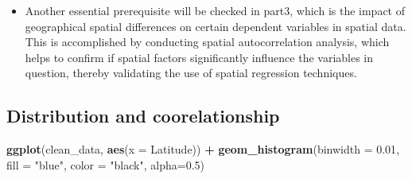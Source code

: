 \documentclass[
]{article}
\newenvironment{Shaded}{\begin{snugshade}}{\end{snugshade}}
\newcommand{\AttributeTok}[1]{\textcolor[rgb]{0.13,0.29,0.53}{#1}}
\newcommand{\FloatTok}[1]{\textcolor[rgb]{0.00,0.00,0.81}{#1}}
\newcommand{\FunctionTok}[1]{\textcolor[rgb]{0.13,0.29,0.53}{\textbf{#1}}}
\newcommand{\NormalTok}[1]{#1}
\newcommand{\OtherTok}[1]{\textcolor[rgb]{0.56,0.35,0.01}{#1}}
\newcommand{\SpecialCharTok}[1]{\textcolor[rgb]{0.81,0.36,0.00}{\textbf{#1}}}
\newcommand{\StringTok}[1]{\textcolor[rgb]{0.31,0.60,0.02}{#1}}
\providecommand{\tightlist}{%
  \setlength{\itemsep}{0pt}\setlength{\parskip}{0pt}}
\begin{document}
\begin{itemize}
\tightlist
\item
  Another essential prerequisite will be checked in part3, which is the
  impact of geographical spatial differences on certain dependent
  variables in spatial data. This is accomplished by conducting spatial
  autocorrelation analysis, which helps to confirm if spatial factors
  significantly influence the variables in question, thereby validating
  the use of spatial regression techniques.
\end{itemize}

\hypertarget{distribution-and-coorelationship}{%
\subsection{Distribution and
coorelationship}\label{distribution-and-coorelationship}}

\begin{Shaded}
\end{Shaded}

\begin{Shaded}
\begin{Highlighting}[]
\FunctionTok{ggplot}\NormalTok{(clean\_data, }\FunctionTok{aes}\NormalTok{(}\AttributeTok{x =}\NormalTok{ Latitude)) }\SpecialCharTok{+} 
  \FunctionTok{geom\_histogram}\NormalTok{(}\AttributeTok{binwidth =} \FloatTok{0.01}\NormalTok{, }\AttributeTok{fill =} \StringTok{"blue"}\NormalTok{, }\AttributeTok{color =} \StringTok{"black"}\NormalTok{, }\AttributeTok{alpha=}\FloatTok{0.5}\NormalTok{)}
\end{Highlighting}
\end{Shaded}
\end{document}
